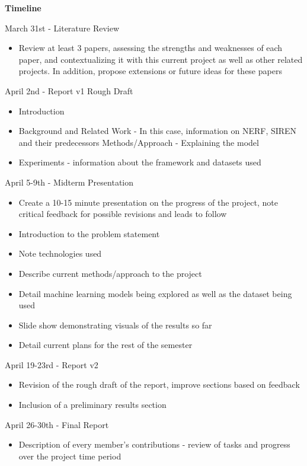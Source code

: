 \documentclass[12pt,twoside]{article}
\begin{document}
	\newpage
	
	\noindent\textbf{Timeline}
	
	\begin{hangparas}{.25in}{1}	
		March 31st - Literature Review
		\begin{itemize}
			\item Review at least 3 papers, assessing the strengths and weaknesses of each paper, and contextualizing it with this current project as well as other related projects. In addition, propose extensions or future ideas for these papers
		\end{itemize}
		
		April 2nd - Report v1 Rough Draft
		\begin{itemize}
			\item Introduction
			\item Background and Related Work - In this case, information on NERF, SIREN and their predecessors
			Methods/Approach - Explaining the model
			\item Experiments - information about the framework and datasets used
		\end{itemize}
		
		April 5-9th - Midterm Presentation
		\begin{itemize}
			\item Create a 10-15 minute presentation on the progress of the project, note critical feedback for possible revisions and leads to follow
			\item Introduction to the problem statement
			\item Note technologies used 
			\item Describe current methods/approach to the project
			\item Detail machine learning models being explored as well as the dataset being used
			\item Slide show demonstrating visuals of the results so far
			\item Detail current plans for the rest of the semester
		\end{itemize}
			
		April 19-23rd - Report v2
		\begin{itemize}
			\item Revision of the rough draft of the report, improve sections based on feedback
			\item Inclusion of a preliminary results section
		\end{itemize}
		
		April 26-30th - Final Report
		\begin{itemize}
			\item Description of every member's contributions - review of tasks and progress over the project time period
		\end{itemize}	
	\end{hangparas}
	


\end{document}
